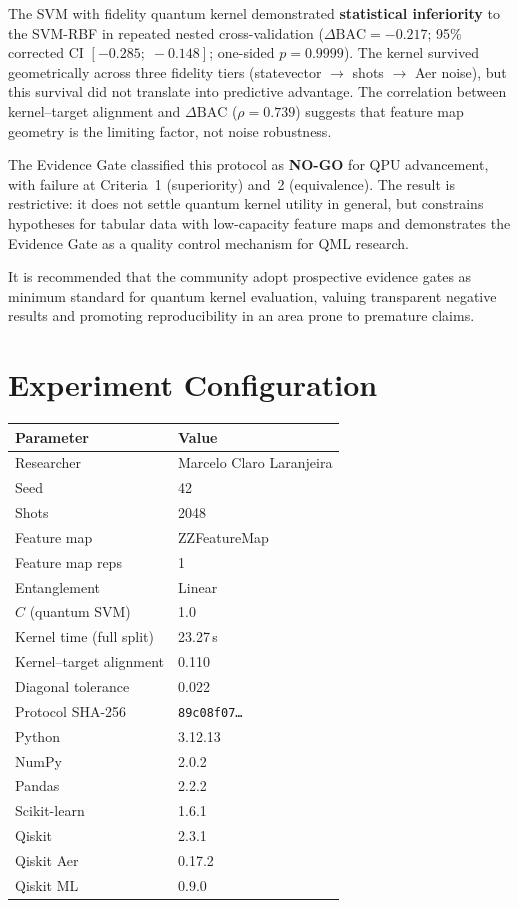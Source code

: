 \documentclass[11pt,a4paper]{article}
\newcommand{\BAC}{\mathrm{BAC}}
\begin{document}
The SVM with fidelity quantum kernel demonstrated \textbf{statistical
inferiority} to the SVM-RBF in repeated nested cross-validation ($\Delta\BAC =
-0.217$; 95\% corrected CI $[-0.285;\; -0.148]$; one-sided $p = 0.9999$).
The kernel survived geometrically across three fidelity tiers (statevector
$\to$ shots $\to$ Aer noise), but this survival did not translate into
predictive advantage. The correlation between kernel--target alignment and
$\Delta\BAC$ ($\rho = 0.739$) suggests that feature map geometry is the
limiting factor, not noise robustness.

The Evidence Gate classified this protocol as \textbf{NO-GO} for QPU
advancement, with failure at Criteria~1 (superiority) and~2 (equivalence). The
result is restrictive: it does not settle quantum kernel utility in general, but
constrains hypotheses for tabular data with low-capacity feature maps and
demonstrates the Evidence Gate as a quality control mechanism for QML research.

It is recommended that the community adopt prospective evidence gates as
minimum standard for quantum kernel evaluation, valuing transparent negative
results and promoting reproducibility in an area prone to premature claims.




\appendix
\section{Experiment Configuration}
\label{app:config}

\begin{table}[htbp]
\centering
\begin{tabular}{@{}ll@{}}
\toprule
Parameter & Value \\
\midrule
Researcher & Marcelo Claro Laranjeira \\
Seed & 42 \\
Shots & 2048 \\
Feature map & ZZFeatureMap \\
Feature map reps & 1 \\
Entanglement & Linear \\
$C$ (quantum SVM) & 1.0 \\
Kernel time (full split) & 23.27\,s \\
Kernel--target alignment & 0.110 \\
Diagonal tolerance & 0.022 \\
Protocol SHA-256 & \texttt{89c08f07\ldots} \\
Python & 3.12.13 \\
NumPy & 2.0.2 \\
Pandas & 2.2.2 \\
Scikit-learn & 1.6.1 \\
Qiskit & 2.3.1 \\
Qiskit Aer & 0.17.2 \\
Qiskit ML & 0.9.0 \\
\bottomrule
\end{tabular}
\end{table}
\end{document}
